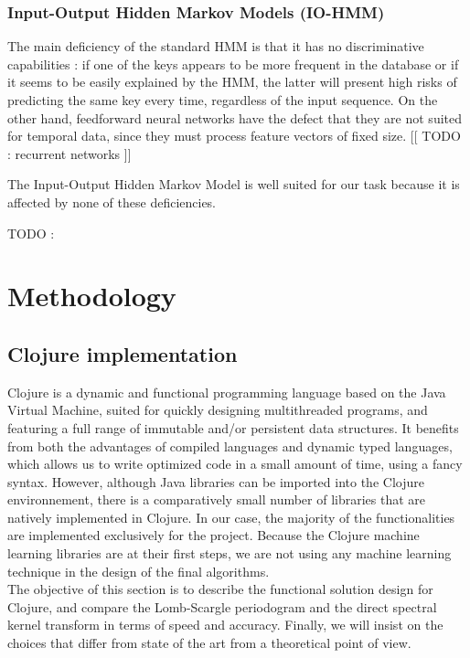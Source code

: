 \documentclass[letterpaper]{article}
\begin{document}
\subsubsection{Input-Output Hidden Markov Models (IO-HMM)}
\label{sssec:iohmm}

The main deficiency of the standard HMM is that it has no discriminative capabilities : if one of the keys appears to be more frequent in the database or
if it seems to be easily explained by the HMM, the latter will present high risks of predicting the same key every time, regardless of the
input sequence. On the other hand, feedforward neural networks have the defect that they are not suited for temporal data, since they must 
process feature vectors of fixed size. [[ TODO : recurrent networks ]]

The Input-Output Hidden Markov Model is well suited for our task because it is affected by none of these deficiencies.

TODO : \citep{YB}

\section{Methodology}


\subsection{Clojure implementation}

Clojure is a dynamic and functional programming language based on the Java Virtual Machine, suited for quickly designing multithreaded programs,
and featuring a full range of immutable and/or persistent data structures. It benefits from both the advantages of compiled languages and dynamic typed
languages, which allows us to write optimized code in a small amount of time, using a fancy syntax. However, although Java libraries can be imported into the Clojure environnement, there is a comparatively small number of libraries that are natively implemented in Clojure. In our case, the majority of the functionalities
are implemented exclusively for the project. Because the Clojure machine learning libraries are at their first steps, we are not using any machine learning 
technique in the design of the final algorithms.\\

The objective of this section is to describe the functional solution design for Clojure, and compare the Lomb-Scargle periodogram and the direct spectral kernel
transform in terms of speed and accuracy. Finally, we will insist on the choices that differ from state of the art from a theoretical point of view.\\
\end{document}
